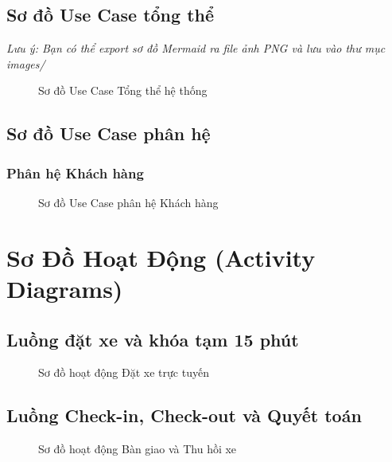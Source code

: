\documentclass[12pt,a4paper]{report}
\begin{document}
\section{Sơ đồ Use Case tổng thể}
\textit{Lưu ý: Bạn có thể export sơ đồ Mermaid ra file ảnh PNG và lưu vào thư mục images/}
\begin{figure}[H]
    \centering
    \fbox{\rule{0pt}{3in} \rule{0.9\linewidth}{0pt}} %
    \caption{Sơ đồ Use Case Tổng thể hệ thống}
\end{figure}

\section{Sơ đồ Use Case phân hệ}
\subsection{Phân hệ Khách hàng}
\begin{figure}[H]
    \centering
    \fbox{\rule{0pt}{2.5in} \rule{0.8\linewidth}{0pt}} %
    \caption{Sơ đồ Use Case phân hệ Khách hàng}
\end{figure}


\chapter{Sơ Đồ Hoạt Động (Activity Diagrams)}

\section{Luồng đặt xe và khóa tạm 15 phút}
\begin{figure}[H]
    \centering
    \fbox{\rule{0pt}{3in} \rule{0.9\linewidth}{0pt}} %
    \caption{Sơ đồ hoạt động Đặt xe trực tuyến}
\end{figure}

\section{Luồng Check-in, Check-out và Quyết toán}
\begin{figure}[H]
    \centering
    \fbox{\rule{0pt}{3in} \rule{0.9\linewidth}{0pt}} %
    \caption{Sơ đồ hoạt động Bàn giao và Thu hồi xe}
\end{figure}
\end{document}

